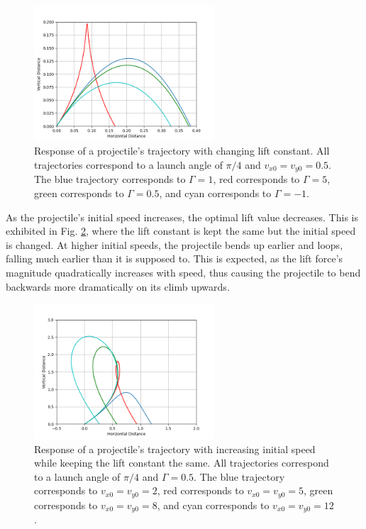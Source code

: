 \documentclass[12pt]{iopart} %
\begin{document}
\begin{figure}[h!tbp]
  \begin{center}
 \item[]\includegraphics[width=0.6\textwidth]{lift1.png}
  \caption{\label{fig:lift1}
  Response of a projectile's trajectory with changing lift constant.
  All trajectories correspond to a launch angle of $\pi/4$ and $v_{x0} = v_{y0} = 0.5$.
  The blue trajectory corresponds to $\Gamma = 1$, red corresponds to $\Gamma = 5$, green corresponds to $\Gamma = 0.5$, and cyan corresponds to $\Gamma = -1$.
  }
  \end{center}
\end{figure}

As the projectile's initial speed increases, the optimal lift value decreases.
This is exhibited in Fig. \ref{fig:lift2}, where the lift constant is kept the same but the initial speed is changed.
At higher initial speeds, the projectile bends up earlier and loops, falling much earlier than it is supposed to.
This is expected, as the lift force's magnitude quadratically increases with speed, thus causing the projectile to bend backwards more dramatically on its climb upwards.

\begin{figure}[h!tbp]
  \begin{center}
 \item[]\includegraphics[width=0.6\textwidth]{lift2.png}
  \caption{\label{fig:lift2}
  Response of a projectile's trajectory with increasing initial speed while keeping the lift constant the same.
  All trajectories correspond to a launch angle of $\pi/4$ and $\Gamma = 0.5$.
  The blue trajectory corresponds to $v_{x0} = v_{y0} = 2$, red corresponds to $v_{x0} = v_{y0} = 5$, green corresponds to $v_{x0} = v_{y0} = 8$, and cyan corresponds to $v_{x0} = v_{y0} = 12$.
  }
  \end{center}
\end{figure}
\end{document}
